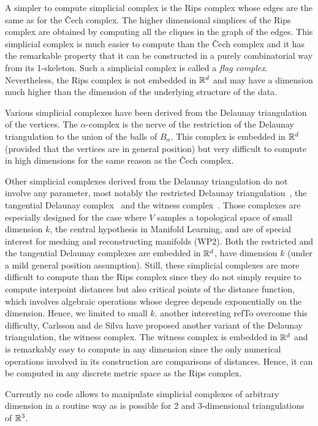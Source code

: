 A simpler to compute simplicial complex is the Rips complex whose edges are the same as for the \v{C}ech complex. The higher dimensional simplices of the Rips complex are obtained by computing all the cliques in the graph of the edges. This simplicial complex is much easier to compute than the \v{C}ech complex and it has the remarkable property that it can be constructed in a purely combinatorial way from its 1-skeleton.  Such a simplicial complex is called a {\em flag
  complex}. Nevertheless, the Rips complex is not embedded in $\mathbb R ^d$
and may have a dimension much higher than the dimension of the underlying structure
of the data.


Various simplicial complexes have been derived from the Delaunay
triangulation of the vertices. The $\alpha$-complex is the nerve of
the restriction of the Delaunay triangulation to the union of the
balls of $B_{\alpha}$. This complex is embedded in $\mathbb R^d$ (provided
that the vertices are in general position) but very difficult to
compute in high dimensions for the same reason as the \v{C}ech complex.

Other simplicial complexes derived from the Delaunay triangulation do not involve any parameter, most notably the restricted Delaunay triangulation~\cite{he-gtmg-2001}, the tangential Delaunay complex~\cite{geometrica-7142i} and the witness complex~\cite{cds-tewc-2004}. Those complexes are especially designed for the case where $V$ samples a topological space of small dimension $k$, the central hypothesis in Manifold Learning, and are of special interest for meshing and reconstructing manifolds (WP2). Both the restricted and the tangential Delaunay complexes are embedded in $\mathbb R^d$, have dimension $k$ (under a mild general position assumption). Still, these simplicial complexes are more difficult to compute 
than the Rips complex since they do not simply require to compute interpoint distances but also  critical points of the distance function, which involves algebraic operations whose degree depends exponentially on the dimension. Hence, we limited to small $k$.
another interesting refTo overcome this difficulty, Carlsson and de Silva have proposed another variant of the Delaunay triangulation,  the witness complex. The witness complex is embedded in $\mathbb R ^d$ and is remarkably easy to compute in any dimension since the only numerical operations involved in its construction are comparisons of distances. Hence, it can be computed in any discrete metric space as the Rips complex.

 Currently no code allows to manipulate simplicial complexes of arbitrary dimension in a routine way as is possible for 2 and 3-dimensional triangulations of $\mathbb R ^3$.

